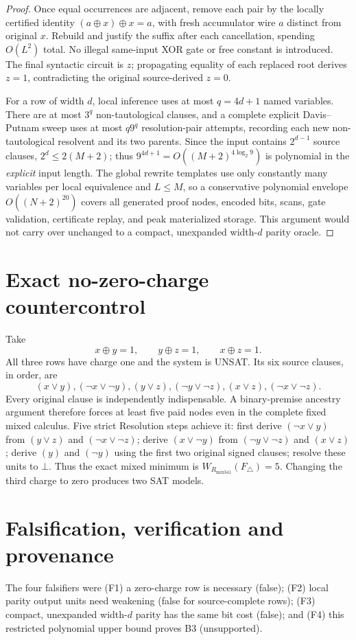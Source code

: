 \documentclass[11pt]{article}
\begin{document}
\begin{proof}
Once equal occurrences are adjacent, remove each pair by the locally certified identity $(a\oplus x)\oplus x=a$, with fresh accumulator wire $a$ distinct from original $x$. Rebuild and justify the suffix after each cancellation, spending $O(L^2)$ total. No illegal same-input XOR gate or free constant is introduced. The final syntactic circuit is $z$; propagating equality of each replaced root derives $z=1$, contradicting the original source-derived $z=0$.

For a row of width $d$, local inference uses at most $q=4d+1$ named variables. There are at most $3^q$ non-tautological clauses, and a complete explicit Davis--Putnam sweep uses at most $q9^q$ resolution-pair attempts, recording each new non-tautological resolvent and its two parents. Since the input contains $2^{d-1}$ source clauses, $2^d\le 2(M+2)$; thus $9^{4d+1}=O((M+2)^{4\log_2 9})$ is polynomial in the \emph{explicit} input length. The global rewrite templates use only constantly many variables per local equivalence and $L\le M$, so a conservative polynomial envelope $O((N+2)^{20})$ covers all generated proof nodes, encoded bits, scans, gate validation, certificate replay, and peak materialized storage. This argument would not carry over unchanged to a compact, unexpanded width-$d$ parity oracle.
\end{proof}

\section*{Exact no-zero-charge countercontrol}
Take
\[
 x\oplus y=1,\qquad y\oplus z=1,\qquad x\oplus z=1.
\]
All three rows have charge one and the system is UNSAT. Its six source clauses, in order, are
\[
(x\vee y),(\neg x\vee\neg y),(y\vee z),(\neg y\vee\neg z),
(x\vee z),(\neg x\vee\neg z).
\]
Every original clause is independently indispensable. A binary-premise ancestry argument therefore forces at least five paid nodes even in the complete fixed mixed calculus. Five strict Resolution steps achieve it: first derive $(\neg x\vee y)$ from $(y\vee z)$ and $(\neg x\vee\neg z)$; derive $(x\vee\neg y)$ from $(\neg y\vee\neg z)$ and $(x\vee z)$; derive $(y)$ and $(\neg y)$ using the first two original signed clauses; resolve these units to $\bot$. Thus the exact mixed minimum is $W_{R_{\mathrm{mix341}}}(F_\triangle)=5$. Changing the third charge to zero produces two SAT models.

\section*{Falsification, verification and provenance}
The four falsifiers were (F1) a zero-charge row is necessary (false); (F2) local parity output units need weakening (false for source-complete rows); (F3) compact, unexpanded width-$d$ parity has the same bit cost (false); and (F4) this restricted polynomial upper bound proves B3 (unsupported).
\end{document}
